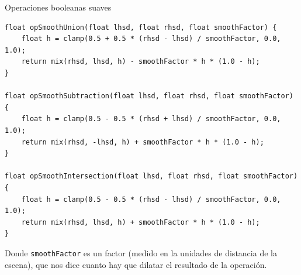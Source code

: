\begin{frame}[fragile]{Operaciones booleanas suaves}
\begin{listing}
\begin{verbatim}
float opSmoothUnion(float lhsd, float rhsd, float smoothFactor) {
    float h = clamp(0.5 + 0.5 * (rhsd - lhsd) / smoothFactor, 0.0, 1.0);
    return mix(rhsd, lhsd, h) - smoothFactor * h * (1.0 - h);
}

float opSmoothSubtraction(float lhsd, float rhsd, float smoothFactor) {
    float h = clamp(0.5 - 0.5 * (rhsd + lhsd) / smoothFactor, 0.0, 1.0);
    return mix(rhsd, -lhsd, h) + smoothFactor * h * (1.0 - h);
}

float opSmoothIntersection(float lhsd, float rhsd, float smoothFactor) {
    float h = clamp(0.5 - 0.5 * (rhsd - lhsd) / smoothFactor, 0.0, 1.0);
    return mix(rhsd, lhsd, h) + smoothFactor * h * (1.0 - h);
}

\end{verbatim}
\end{listing}
Donde \texttt{smoothFactor} es un factor (medido en la unidades de distancia de la escena), que nos dice cuanto hay que \alert{dilatar} el resultado de la operación.
\end{frame}

